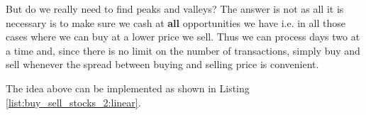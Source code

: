 But do we really need to find peaks and valleys? The answer is not as all it is necessary is to make sure we cash at \textbf{all} opportunities we have i.e. in all those cases where we can buy at a lower price we sell. Thus we can process days two at a time and, since there is no limit on the number of transactions, simply buy and sell whenever the spread between buying and selling price is convenient. 

The idea above can be implemented as shown in Listing \ref{list:buy_sell_stocks_2:linear}. 




